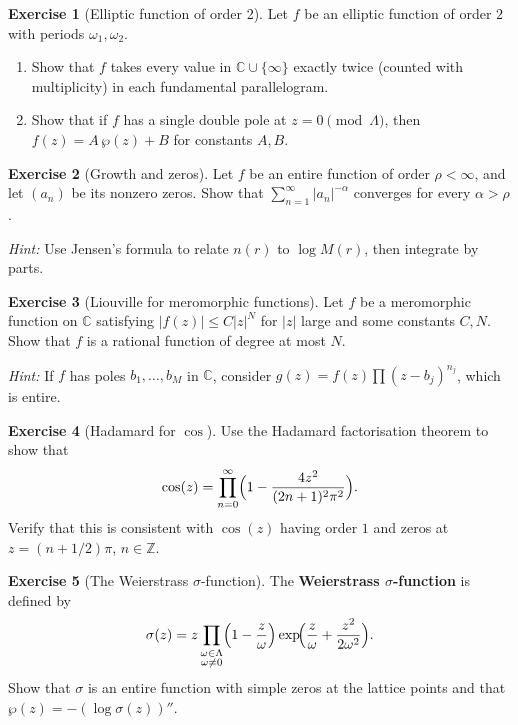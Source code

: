 \documentclass[12pt,a4paper,openany]{book}
\theoremstyle{definition}
\newtheorem{exercise}{Exercise}[chapter]
\theoremstyle{plain}
\theoremstyle{remark}
\newcommand{\C}{\mathbb{C}}
\newcommand{\Z}{\mathbb{Z}}
\newcommand{\abs}[1]{\left|#1\right|}
\begin{document}
\begin{exercise}[Elliptic function of order 2]\label{exer:elliptic-order2}
Let $f$ be an elliptic function of order $2$ with periods $\omega_1, \omega_2$.
\begin{enumerate}[label=(\alph*)]
  \item Show that $f$ takes every value in $\C \cup \{\infty\}$ exactly
    twice (counted with multiplicity) in each fundamental parallelogram.
  \item Show that if $f$ has a single double pole at $z = 0 \pmod{\Lambda}$,
    then $f(z) = A\,\wp(z) + B$ for constants $A, B$.
\end{enumerate}
\end{exercise}

\begin{exercise}[Growth and zeros]\label{exer:growth-zeros}
Let $f$ be an entire function of order $\rho < \infty$, and let
$(a_n)$ be its nonzero zeros. Show that
$\sum_{n=1}^{\infty}\abs{a_n}^{-\alpha}$ converges for every
$\alpha > \rho$.

\emph{Hint:} Use Jensen's formula to relate $n(r)$ to $\log M(r)$,
then integrate by parts.
\end{exercise}

\begin{exercise}[Liouville for meromorphic functions]\label{exer:liouville-mero}
Let $f$ be a meromorphic function on $\C$ satisfying
$\abs{f(z)} \leq C\abs{z}^N$ for $\abs{z}$ large and some constants
$C, N$. Show that $f$ is a rational function of degree at most $N$.

\emph{Hint:} If $f$ has poles $b_1,\ldots,b_M$ in $\C$, consider
$g(z) = f(z)\prod(z-b_j)^{n_j}$, which is entire.
\end{exercise}

\begin{exercise}[Hadamard for $\cos$]\label{exer:hadamard-cos}
Use the Hadamard factorisation theorem to show that
\[
  \cos(z) = \prod_{n=0}^{\infty}\Bigl(1 - \frac{4z^2}{(2n+1)^2\pi^2}\Bigr).
\]
Verify that this is consistent with $\cos(z)$ having order $1$ and zeros
at $z = (n+1/2)\pi$, $n \in \Z$.
\end{exercise}

\begin{exercise}[The Weierstrass $\sigma$-function]\label{exer:sigma-function}
The \textbf{Weierstrass $\sigma$-function} is defined by
\[
  \sigma(z) = z\prod_{\substack{\omega\in\Lambda\\\omega\neq 0}}
  \Bigl(1-\frac{z}{\omega}\Bigr)\exp\!\Bigl(\frac{z}{\omega}+\frac{z^2}{2\omega^2}\Bigr).
\]
Show that $\sigma$ is an entire function with simple zeros at the lattice
points and that $\wp(z) = -(\log\sigma(z))''$.
\end{exercise}
\end{document}
